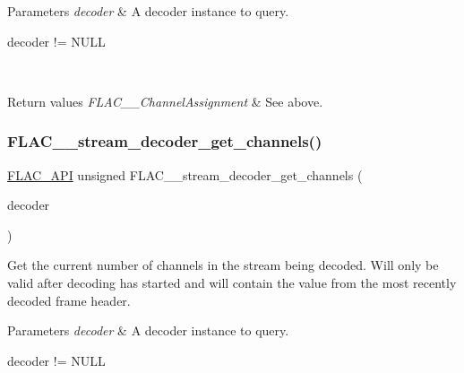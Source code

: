 \begin{DoxyParams}{Parameters}
{\em decoder} & A decoder instance to query.  
\begin{DoxyCode}
decoder != NULL 
\end{DoxyCode}
 \\
\hline
\end{DoxyParams}

\begin{DoxyRetVals}{Return values}
{\em F\+L\+A\+C\+\_\+\+\_\+\+Channel\+Assignment} & See above. \\
\hline
\end{DoxyRetVals}
\mbox{\label{group__flac__stream__decoder_ga42b7d224faeee633e6359ac1f921f39a}} 
\subsubsection{\texorpdfstring{F\+L\+A\+C\+\_\+\+\_\+stream\+\_\+decoder\+\_\+get\+\_\+channels()}{FLAC\_\_stream\_decoder\_get\_channels()}}
{\footnotesize\ttfamily \hyperlink{group__flac__export_ga56ca07df8a23310707732b1c0007d6f5}{F\+L\+A\+C\+\_\+\+A\+PI} unsigned F\+L\+A\+C\+\_\+\+\_\+stream\+\_\+decoder\+\_\+get\+\_\+channels (\begin{DoxyParamCaption}\item[{\hyperlink{zconf_8h_a2c212835823e3c54a8ab6d95c652660e}{const} \hyperlink{struct_f_l_a_c_____stream_decoder}{F\+L\+A\+C\+\_\+\+\_\+\+Stream\+Decoder} $\ast$}]{decoder }\end{DoxyParamCaption})}

Get the current number of channels in the stream being decoded. Will only be valid after decoding has started and will contain the value from the most recently decoded frame header.


\begin{DoxyParams}{Parameters}
{\em decoder} & A decoder instance to query.  
\begin{DoxyCode}
decoder != NULL 
\end{DoxyCode}
 \\
\hline
\end{DoxyParams}

